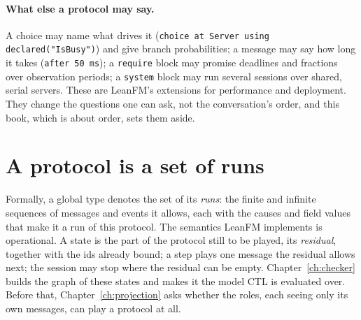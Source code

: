 \paragraph{What else a protocol may say.} A choice may name what drives it
(\texttt{choice at Server using declared("IsBusy")}) and give branch probabilities;
a message may say how long it takes (\texttt{after 50 ms}); a \texttt{require} block
may promise deadlines and fractions over observation periods; a \texttt{system} block
may run several sessions over shared, serial servers. These are LeanFM's extensions
for performance and deployment. They change the questions one can ask, not the
conversation's order, and this book, which is about order, sets them aside.

\section{A protocol is a set of runs}

Formally, a global type denotes the set of its \emph{runs}: the finite and infinite
sequences of messages and events it allows, each with the causes and field values
that make it a run of this protocol. The semantics LeanFM implements is operational.
A state is the part of the protocol still to be played, its \emph{residual}, together
with the ids already bound; a step plays one message the residual allows next; the
session may stop where the residual can be empty. Chapter~\ref{ch:checker} builds the
graph of these states and makes it the model CTL is evaluated over. Before that,
Chapter~\ref{ch:projection} asks whether the roles, each seeing only its own messages,
can play a protocol at all.
